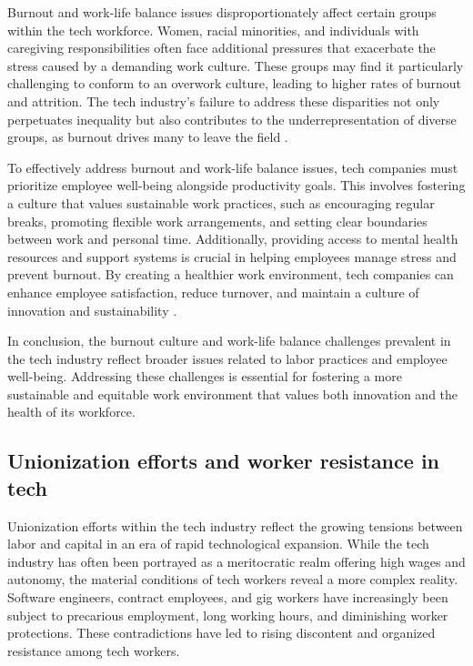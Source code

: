 Burnout and work-life balance issues disproportionately affect certain groups within the tech workforce. Women, racial minorities, and individuals with caregiving responsibilities often face additional pressures that exacerbate the stress caused by a demanding work culture. These groups may find it particularly challenging to conform to an overwork culture, leading to higher rates of burnout and attrition. The tech industry's failure to address these disparities not only perpetuates inequality but also contributes to the underrepresentation of diverse groups, as burnout drives many to leave the field \cite[pp.~167-169]{kapor2017leavers}.

To effectively address burnout and work-life balance issues, tech companies must prioritize employee well-being alongside productivity goals. This involves fostering a culture that values sustainable work practices, such as encouraging regular breaks, promoting flexible work arrangements, and setting clear boundaries between work and personal time. Additionally, providing access to mental health resources and support systems is crucial in helping employees manage stress and prevent burnout. By creating a healthier work environment, tech companies can enhance employee satisfaction, reduce turnover, and maintain a culture of innovation and sustainability \cite[pp.~61-63]{gelles2016mindful}.

In conclusion, the burnout culture and work-life balance challenges prevalent in the tech industry reflect broader issues related to labor practices and employee well-being. Addressing these challenges is essential for fostering a more sustainable and equitable work environment that values both innovation and the health of its workforce.

\subsection{Unionization efforts and worker resistance in tech}

Unionization efforts within the tech industry reflect the growing tensions between labor and capital in an era of rapid technological expansion. While the tech industry has often been portrayed as a meritocratic realm offering high wages and autonomy, the material conditions of tech workers reveal a more complex reality. Software engineers, contract employees, and gig workers have increasingly been subject to precarious employment, long working hours, and diminishing worker protections. These contradictions have led to rising discontent and organized resistance among tech workers.

